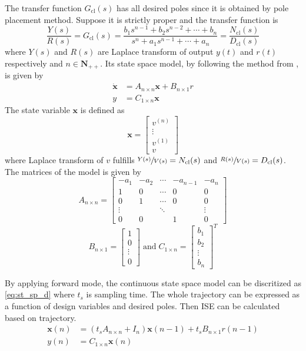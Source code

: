 The transfer function $G_{\text{cl}}(s)$ has all desired poles since it is  obtained by pole placement method. Suppose it is strictly proper and the transfer function is 
$$\frac{Y(s)}{R(s)}=G_{\text{cl}}(s)=\frac{b_1s^{n-1}+b_2s^{n-2}+ \cdots +b_n}{s^n+a_1s^{n-1}+ \cdots + a_n}=\frac{N_\text{cl}(s)}{D_{\text{cl}}(s)}$$ where $Y(s)$ and $R(s)$ are Laplace transform of output $y(t)$ and $r(t)$ respectively and $n \in \mathbf{N_{++}}$. Its state space model, by following the method from \cite{astrom2010feedback}, is given by 
\begin{equation}\label{eq:st_sp}
\begin{aligned} 
\dot{\mathbf{x}}&=A_{n \times n}\mathbf{x}+B_{n \times 1}r\\
y&=C_{1 \times n} \mathbf{x}
\end{aligned} 
\end{equation}
The state variable $\mathbf{x}$ is defined as $$\mathbf{x}=\left[\begin{array}{c}v^{(n)}\\ \vdots \\v^{(1)}\\v \end{array}\right]$$ where Laplace transform of $v$ fulfills $\sfrac{Y(s)}{V(s)}=N_{\text{cl}}(s)$ and $\sfrac{R(s)}{V(s)}=D_{\text{cl}}(s)$. The matrices of the model is given by $$ A_{n \times n} = 
 \left[\begin{array}{ccccc}
  -a_1 & -a_2 & \cdots & -a_{n-1} & -a_n \\
  1 &	0 & \cdots & 0 & 0 \\
  0 &	1 & \cdots & 0 & 0 \\
  \vdots  &   & \ddots & & \vdots  \\
  0 & 0 &  & 1 & 0
 \end{array}\right] $$ $$ B_{n \times 1} = \left[\begin{array}{c}1\\0\\ \vdots \\ 0 \end{array}\right]\; \text{and}\; C_{1 \times n}= \left[\begin{array}{c}b_1\\b_2\\ \vdots \\ b_n \end{array}\right]^T $$
 
By applying forward mode, the continuous state space model can be  discritized as \ref{eq:st_sp_d} where $t_s$ is sampling time. The whole trajectory can be expressed as a function of design variables and desired poles. Then ISE can be calculated based on trajectory. \begin{equation}\label{eq:st_sp_d}
\begin{aligned} 
\mathbf{x}(n)& =(t_sA_{n \times n}+I_n)\mathbf{x}(n-1)+t_sB_{n \times 1}r(n-1)\\
y(n) & = C_{1 \times n} \mathbf{x}(n)
\end{aligned} 
\end{equation} 

